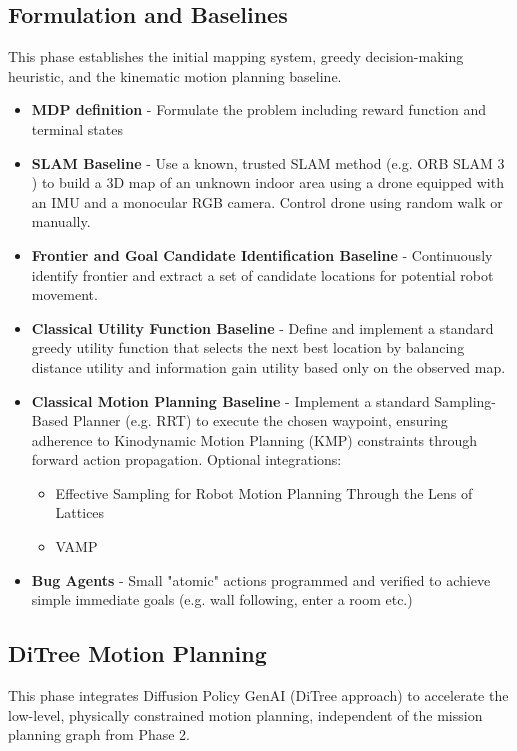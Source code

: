 \documentclass[12pt]{article}
\begin{document}
\subsection{Formulation and Baselines}
This phase establishes the initial mapping system, greedy decision-making heuristic, and the kinematic motion planning baseline.

\begin{itemize}
    \item \textbf{MDP definition} - Formulate the problem including reward function and terminal states
    \item \textbf{SLAM Baseline} - Use a known, trusted SLAM method (e.g. ORB SLAM 3 \cite{campos2021orbslam3}) to build a 3D map of an unknown indoor area using a drone equipped with an IMU and a monocular RGB camera. Control drone using random walk or manually.
    \item \textbf{Frontier and Goal Candidate Identification Baseline} - Continuously identify frontier and extract a set of candidate locations for potential robot movement.
    \item  \textbf{Classical Utility Function Baseline} - Define and implement a standard greedy utility function that selects the next best location by balancing distance utility and information gain utility based only on the observed map.
    \item \textbf{Classical Motion Planning Baseline} - Implement a standard Sampling-Based Planner (e.g. RRT) to execute the chosen waypoint, ensuring adherence to Kinodynamic Motion Planning (KMP) constraints through forward action propagation.
    Optional integrations:
    \begin{itemize}
        \item Effective Sampling for Robot Motion Planning Through the Lens of Lattices~\cite{PanasoffI-RSS-25}
        \item VAMP~\cite{thomason_motions_microseconds_2024}
    \end{itemize}
    \item \textbf{Bug Agents} - Small "atomic" actions programmed and verified to achieve simple immediate goals (e.g. wall following, enter a room etc.)
\end{itemize}


\subsection{DiTree Motion Planning}
This phase integrates Diffusion Policy GenAI (DiTree approach) to accelerate the low-level, physically constrained motion planning, independent of the mission planning graph from Phase 2.
\end{document}
